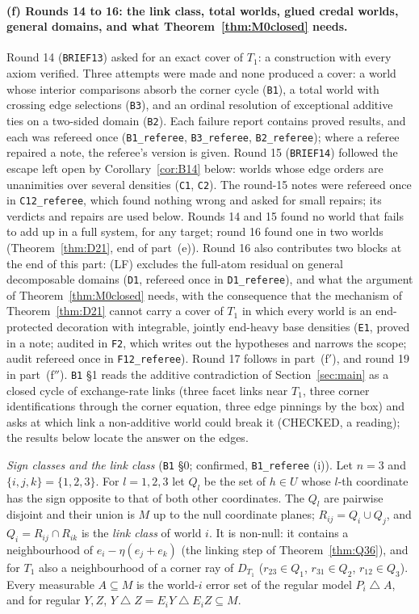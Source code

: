 \documentclass[11pt]{article}
\theoremstyle{definition}
\theoremstyle{remark}
\newcommand{\sd}{\mathbin{\triangle}}
\newcommand{\src}[1]{\texttt{#1}}
\begin{document}
\paragraph{(f) Rounds 14 to 16: the link class, total worlds, glued credal worlds, general domains, and what Theorem~\ref{thm:M0closed} needs.} Round 14 (\src{BRIEF13}) asked for an exact cover of $T_1$: a construction with every axiom verified. Three attempts were made and none produced a cover: a world whose interior comparisons absorb the corner cycle (\src{B1}), a total world with crossing edge selections (\src{B3}), and an ordinal resolution of exceptional additive ties on a two-sided domain (\src{B2}). Each failure report contains proved results, and each was refereed once (\src{B1\_referee}, \src{B3\_referee}, \src{B2\_referee}); where a referee repaired a note, the referee's version is given. Round 15 (\src{BRIEF14}) followed the escape left open by Corollary~\ref{cor:B14} below: worlds whose edge orders are unanimities over several densities (\src{C1}, \src{C2}). The round-15 notes were refereed once in \src{C12\_referee}, which found nothing wrong and asked for small repairs; its verdicts and repairs are used below. Rounds 14 and 15 found no world that fails to add up in a full system, for any target; round 16 found one in two worlds (Theorem~\ref{thm:D21}, end of part~(e)). Round 16 also contributes two blocks at the end of this part: (LF) excludes the full-atom residual on general decomposable domains (\src{D1}, refereed once in \src{D1\_referee}), and what the argument of Theorem~\ref{thm:M0closed} needs, with the consequence that the mechanism of Theorem~\ref{thm:D21} cannot carry a cover of $T_1$ in which every world is an end-protected decoration with integrable, jointly end-heavy base densities (\src{E1}, proved in a note; audited in \src{F2}, which writes out the hypotheses and narrows the scope; audit refereed once in \src{F12\_referee}). Round 17 follows in part~(f$'$), and round 19 in part~(f$''$). \src{B1} \S1 reads the additive contradiction of Section~\ref{sec:main} as a closed cycle of exchange-rate links (three facet links near $T_1$, three corner identifications through the corner equation, three edge pinnings by the box) and asks at which link a non-additive world could break it (CHECKED, a reading); the results below locate the answer on the edges.

\emph{Sign classes and the link class} (\src{B1} \S0; confirmed, \src{B1\_referee} (i)). Let $n=3$ and $\{i,j,k\}=\{1,2,3\}$. For $l=1,2,3$ let $Q_l$ be the set of $h\in U$ whose $l$-th coordinate has the sign opposite to that of both other coordinates. The $Q_l$ are pairwise disjoint and their union is $M$ up to the null coordinate planes; $R_{ij}=Q_i\cup Q_j$, and $Q_i=R_{ij}\cap R_{ik}$ is the \emph{link class} of world $i$. It is non-null: it contains a neighbourhood of $e_i-\eta(e_j+e_k)$ (the linking step of Theorem~\ref{thm:Q36}), and for $T_1$ also a neighbourhood of a corner ray of $D_{T_1}$ ($r_{23}\in Q_1$, $r_{31}\in Q_2$, $r_{12}\in Q_3$). Every measurable $A\subseteq M$ is the world-$i$ error set of the regular model $P_i\sd A$, and for regular $Y,Z$, $Y\sd Z=E_iY\sd E_iZ\subseteq M$.
\end{document}

